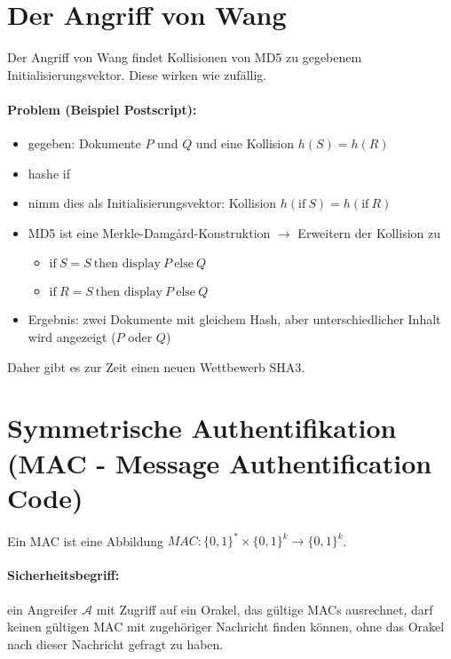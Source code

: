 \documentclass[a4paper,twoside,DIV15,BCOR12mm]{scrbook}
\begin{document}
\section{Der Angriff von Wang}

Der Angriff von Wang findet Kollisionen von MD5 zu gegebenem Initialisierungsvektor. Diese wirken wie zufällig.

\paragraph{Problem (Beispiel Postscript):}

\begin{itemize}
	\item gegeben: Dokumente $P$ und $Q$ und eine Kollision $h(S) = h(R)$
	\item hashe \glqq if\grqq\
	\item nimm dies als Initialisierungsvektor: Kollision $h(\text{if}\ S) = h(\text{if}\ R)$
	\item MD5 ist eine Merkle-Damg\r{a}rd-Konstruktion $\rightarrow$ Erweitern der Kollision zu
		\begin{itemize}
			\item $\text{if}\ S=S\ \text{then display}\ P\ \text{else}\ Q$
			\item $\text{if}\ R=S\ \text{then display}\ P\ \text{else}\ Q$
		\end{itemize}
	\item Ergebnis: zwei Dokumente mit gleichem Hash, aber unterschiedlicher Inhalt wird angezeigt ($P$ oder $Q$)
\end{itemize}

Daher gibt es zur Zeit einen neuen Wettbewerb SHA3.

\section{Symmetrische Authentifikation (MAC - Message Authentification Code)} \label{mac}

Ein MAC ist eine Abbildung ${MAC} \colon {\{ 0, 1 \}}^* \times {\{ 0, 1 \}}^{k}\rightarrow {\{ 0, 1 \}}^k$.

\paragraph{Sicherheitsbegriff:} ein Angreifer $\mathcal{A}$ mit Zugriff auf ein Orakel, das gültige MACs ausrechnet, darf keinen gültigen MAC mit zugehöriger Nachricht finden können, ohne das Orakel nach dieser Nachricht gefragt zu haben.
\end{document}
